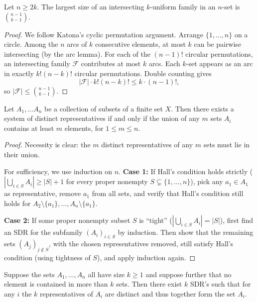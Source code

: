 \begin{theorem}
  \label{ch30theorem2}
  \leanok
  Let $n \ge 2k$. The largest size of an intersecting $k$-uniform family in an $n$-set is $\binom{n - 1}{k - 1}$.
\end{theorem}
\begin{proof}
  \leanok
  We follow Katona's cyclic permutation argument. Arrange $\{1,\dots,n\}$ on a circle.
  Among the $n$ arcs of $k$ consecutive elements, at most $k$ can be pairwise intersecting
  (by the arc lemma). For each of the $(n-1)!$ circular permutations, an intersecting family
  $\mathcal{F}$ contributes at most $k$ arcs. Each $k$-set appears as an arc in exactly
  $k!(n-k)!$ circular permutations. Double counting gives
  \[
    |\mathcal{F}| \cdot k!(n-k)! \le k \cdot (n-1)!,
  \]
  so $|\mathcal{F}| \le \binom{n-1}{k-1}$.
\end{proof}

\begin{theorem}
  \label{ch30theorem3}
  \leanok
  Let  $A_1, \dots A_n$ be a collection of subsets of a finite set $X$.
  Then there exists a system of distinct representatives if and only if the union of any $m$
  sets $A_i$ contains at least $m$ elements, for $1 \le m \le n$.
\end{theorem}
\begin{proof}
  \leanok
  Necessity is clear: the $m$ distinct representatives of any $m$ sets must lie in their union.

  For sufficiency, we use induction on $n$. \textbf{Case 1:} If Hall's condition holds strictly
  ($|\bigcup_{i \in S} A_i| \ge |S| + 1$ for every proper nonempty $S \subsetneq \{1,\dots,n\}$),
  pick any $a_1 \in A_1$ as representative, remove $a_1$ from all sets, and verify that
  Hall's condition still holds for $A_2 \setminus \{a_1\}, \dots, A_n \setminus \{a_1\}$.

  \textbf{Case 2:} If some proper nonempty subset $S$ is ``tight''
  ($|\bigcup_{i \in S} A_i| = |S|$), first find an SDR for the subfamily $(A_i)_{i \in S}$
  by induction. Then show that the remaining sets $(A_j)_{j \notin S}$, with the chosen
  representatives removed, still satisfy Hall's condition (using tightness of $S$),
  and apply induction again.
\end{proof}

\begin{corollary}
  \label{ch30corollary}
  Suppose the sets $A_1, \dots, A_n$ all have size $k \ge 1$ and suppose further that no element
  is contained in more than $k$ sets. Then there exist $k$ SDR's such that for any $i$ the $k$
  representatives of $A_i$ are distinct and thus together form the set $A_i$.
\end{corollary}
